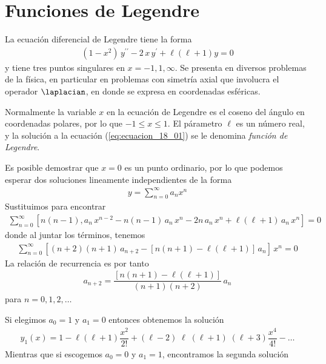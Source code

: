 \section{Funciones de Legendre}
La ecuación diferencial de Legendre tiene la forma
\begin{align}
(1 - x^{2}) \, y^{\prime \prime} - 2 \, x \, y^{\prime} + \ell (\ell + 1) y = 0
\label{eq:ecuacion_18_01}
 \end{align}
y tiene tres puntos singulares en $x = -1, 1, \infty$. Se presenta en diversos problemas de la física, en particular en problemas con simetría axial que involucra el operador $\laplacian$, en donde se expresa en coordenadas esféricas.
\par
Normalmente la variable $x$ en la ecuación de Legendre es el coseno del ángulo en coordenadas polares, por lo que $-1 \leq x \leq 1$. El párametro $\ell$ es un número real, y la solución a la ecuación (\ref{eq:ecuacion_18_01}) se le denomina \emph{función de Legendre}.
\par
Es posible demostrar que $x = 0$ es un punto ordinario, por lo que podemos esperar dos soluciones lineamente independientes de la forma
\begin{align*}
y = \sum_{n=0}^{\infty} a_{n} x^{n}
\end{align*}
Sustituimos para encontrar
\begin{align*}
\sum_{n=0}^{\infty} \left[ n (n-1) , a_{n} \, x^{n-2} - n (n-1) \, a_{n} \, x^{n} - 2 n \, a_{n} \, x^{n} + \ell (\ell + 1) \, a_{n}  \, x^{n} \right] = 0 
\end{align*}
donde al juntar los términos, tenemos
\begin{align*}
 \sum_{n=0}^{\infty} \left[ (n+2)(n+1) \, a_{n+2} - [ n(n+1) - \ell (\ell + 1) ] \, a_{n} \right] \,x^{n} = 0
\end{align*}
La relación de recurrencia es por tanto
\begin{align}
a_{n+2} = \dfrac{[n (n+1) - \ell ( \ell + 1)]}{(n+1)(n+2)} \, a_{n}
\label{eq:ecuacion_18_02}
\end{align}
para $n = 0, 1, 2, \ldots$
\par
Si elegimos $a_{0} = 1$ y $a_{1} = 0$ entonces obtenemos la solución
\begin{align}
y_{1}(x) = 1 - \ell (\ell + 1) \dfrac{x^{2}}{2!} + (\ell - 2)\; \ell \; (\ell + 1)\;(\ell + 3) \dfrac{x^{4}}{4!} - \ldots
\label{eq:ecuacion_18_03}
\end{align}
Mientras que si escogemos $a_{0} = 0$ y $ a_{1} = 1 $, encontramos la segunda solución
